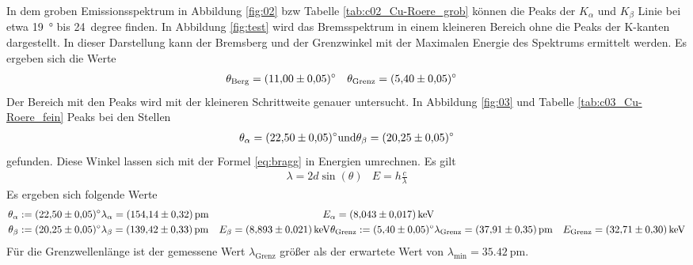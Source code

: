 In dem groben Emissionsspektrum in Abbildung \ref{fig:02} bzw Tabelle \ref{tab:c02_Cu-Roere_grob} können die
Peaks der $K_\alpha$ und $K_\beta$ Linie bei etwa \qty{19}{\degree} bis
\qty{24}{degree} finden.
In Abbildung \ref{fig:test} wird das Bremsspektrum in einem kleineren Bereich ohne die Peaks der K-kanten dargestellt.
In dieser Darstellung kann der Bremsberg und der Grenzwinkel mit der Maximalen Energie des Spektrums ermittelt werden.
Es ergeben sich die Werte
\begin{align*}
    \theta_\text{Berg}  &= \qty{11.0 \pm 0.05}{\degree} &
    \theta_\text{Grenz} &= \qty{5.4  \pm 0.05}{\degree} 
\end{align*} 
Der Bereich mit den Peaks wird mit der kleineren Schrittweite genauer untersucht.
In Abbildung \ref{fig:03} und Tabelle \ref{tab:c03_Cu-Roere_fein} Peaks bei den Stellen 
\begin{align}
    \theta_\alpha = \qty{22.50 \pm 0.05}{\degree} \text{und}
    \theta_\beta = \qty{ 20.25 \pm 0.05}{\degree}
\end{align}
gefunden.
Diese Winkel lassen sich mit der Formel \eqref{eq:bragg} in Energien umrechnen.
Es gilt
\begin{align*}
    \lambda = 2 d \sin(\theta) & E = h \frac{c}{\lambda}
\end{align*}
Es ergeben sich folgende Werte 
\begin{align*}
    \theta_\alpha:        = \qty{22.50 \pm 0.05}{\degree} & \lambda_\alpha = \qty{154.14 \pm 0.32}{\pico\meter}  & E_\alpha = \qty{8.043 \pm 0.017}{\kilo\eV}  \\
    \theta_\beta:         = \qty{20.25 \pm 0.05}{\degree} & \lambda_\beta  = \qty{139.42 \pm 0.33}{\pico\meter}  & E_\beta  = \qty{8.893 \pm 0.021}{\kilo\eV}   
    \theta_\text{Grenz}:  = \qty{5.4 \pm 0.05}{\degree} & \lambda_\text{Grenz}  = \qty{37.91 \pm 0.35}{\pico\meter}  & E_\text{Grenz}  = \qty{32.71 \pm 0.30}{\kilo\eV}   
\end{align*}
Für die Grenzwellenlänge ist der gemessene Wert $\lambda_\text{Grenz}$ größer als der erwartete Wert von $\lambda_\text{min}= \qty{35.42}{\pico\m}$.


